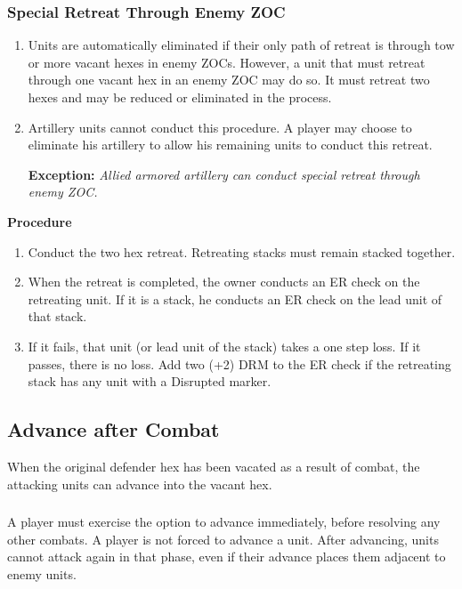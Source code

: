 \subsubsection{\textbf{Special Retreat Through Enemy ZOC}}

\begin{enumerate}[label=\alph*.]
    \item Units are automatically eliminated if their only path of retreat is through tow or more vacant hexes in enemy ZOCs. However, a unit that must retreat through one vacant hex in an enemy ZOC may do so. It must retreat two hexes and may be reduced or eliminated in the process.
    \item Artillery units cannot conduct this procedure. A player may choose to eliminate his artillery to allow his remaining units to conduct this retreat.
    
    \textbf{Exception:} \textit{Allied armored artillery can conduct special retreat through enemy ZOC.}
\end{enumerate}

\textbf{Procedure}

\begin{enumerate}[label=\Roman*.]
    \item Conduct the two hex retreat. Retreating stacks must remain stacked together.
    \item When the retreat is completed, the owner conducts an ER check on the retreating unit. If it is a stack, he conducts an ER check on the lead unit of that stack.
    \item If it fails, that unit (or lead unit of the stack) takes a one step loss. If it passes, there is no loss. Add two (+2) DRM to the ER check if the retreating stack has any unit with a Disrupted marker.
\end{enumerate}

\subsection{Advance after Combat}

When the original defender hex has been vacated as a result of combat, the attacking units can advance into the vacant hex.

\subsubsection{}
A player must exercise the option to advance immediately, before resolving any other combats. A player is not forced to advance a unit. After advancing, units cannot attack again in that phase, even if their advance places them adjacent to enemy units.

